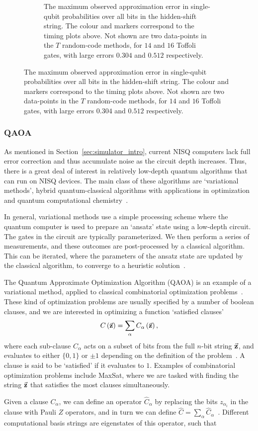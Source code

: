 \begin{figure}[p]
\begin{subfigure}[t]{0.6\textwidth}
\caption{The maximum observed approximation error in single-qubit probabilities over all bits in the hidden-shift string. The colour and markers correspond to the timing plots above. Not shown are two data-points in the $T$ random-code methods, for $14$ and $16$ Toffoli gates, with large errors $0.304$ and $0.512$ respectively.}
\end{subfigure}
\end{figure}
\subsubsection*{QAOA}
As mentioned in Section~\ref{sec:simulator_intro}, current NISQ computers lack full error correction and thus accumulate noise as the circuit depth increases. Thus, there is a great deal of interest in relatively low-depth quantum algorithms that can run on NISQ devices. The main class of these algorithms are `variational methods', hybrid quantum-classical algorithms with applications in optimization and quantum computational chemistry~\cite{Moll2018}.\par
In general, variational methods use a simple processing scheme where the quantum computer is used to prepare an `ansatz' state using a low-depth circuit. The gates in the circuit are typically parameterized. We then perform a series of measurements, and these outcomes are post-processed by a classical algorithm. This can be iterated, where the parameters of the ansatz state are updated by the classical algorithm, to converge to a heuristic solution~\cite{Preskill2018,Moll2018}.\par
The Quantum Approximate Optimization Algorithm (QAOA) is an example of a variational method, applied to classical combinatorial optimization problems~\cite{Farhi2014}. These kind of optimization problems are usually specified by a number of boolean clauses, and we are interested in optimizing a function `satisfied clauses'
\[C\left(\va{z}\right) = \sum_{\alpha} C_{\alpha}\left(\va{z}\right),\]
where each sub-clause $C_{\alpha}$ acts on a subset of bits from the full $n$-bit string $\va{z}$, and evaluates to either $\{0,1\}$ or $\pm 1$ depending on the definition of the problem~\cite{Farhi2014}. A clause is said to be `satisfied' if it evaluates to $1$. Examples of combinatorial optimization problems include MaxSat, where we are tasked with finding the string $\va{z}$ that satisfies the most clauses simultaneously.\par
Given a clause $C_{\alpha}$, we can define an operator $\hat{C}_{\alpha}$ by replacing the bits $z_{\alpha_{i}}$ in the clause with Pauli $Z$ operators, and in turn we can define $\hat{C}=\sum_{\alpha}\hat{C}_{\alpha}$~\cite{Farhi2014}. Different computational basis strings are eigenstates of this operator, such that 
